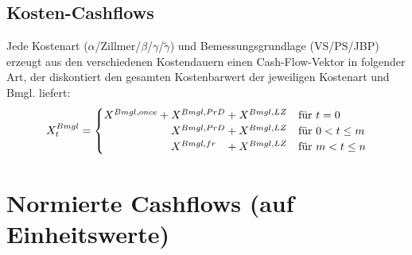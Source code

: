 \documentclass[a4paper,10pt]{article}
\begin{document}
\subsection{Kosten-Cashflows}
Jede Kostenart ($\alpha$/Zillmer/$\beta$/$\gamma$/$\tilde{\gamma}$) und Bemessungsgrundlage (VS/{}PS/{}JBP) erzeugt aus den verschiedenen Kostendauern einen Cash-Flow-Vektor in folgender Art, der diskontiert den gesamten Kostenbarwert der jeweiligen Kostenart und Bmgl. liefert:
\begin{equation*}
 X_t^{Bmgl} = 
 \begin{cases}
 X^{Bmgl,once} + X^{Bmgl,PrD} + X^{Bmgl,LZ} & \text{für $t=0$} \\
 \hphantom{X^{Bmgl,once} + \;\,} X^{Bmgl,PrD} + X^{Bmgl,LZ} & \text{für $0<t\leq m$} \\
 \hphantom{X^{Bmgl,once} + \;\,} X^{Bmgl,fr} \;\;\; + X^{Bmgl,LZ} & \text{für $m<t\leq n$}
 \end{cases}
\end{equation*}




\pagebreak

\section{Normierte Cashflows (auf Einheitswerte)}
\end{document}
